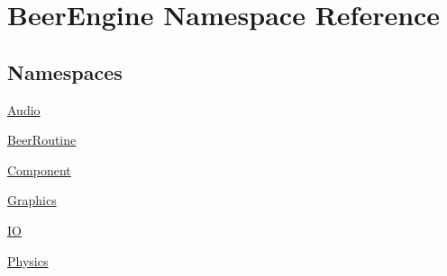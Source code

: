\hypertarget{namespace_beer_engine}{}\section{Beer\+Engine Namespace Reference}
\label{namespace_beer_engine}
\subsection*{Namespaces}
\begin{DoxyCompactItemize}
\item 
 \mbox{\hyperlink{namespace_beer_engine_1_1_audio}{Audio}}
\item 
 \mbox{\hyperlink{namespace_beer_engine_1_1_beer_routine}{Beer\+Routine}}
\item 
 \mbox{\hyperlink{namespace_beer_engine_1_1_component}{Component}}
\item 
 \mbox{\hyperlink{namespace_beer_engine_1_1_graphics}{Graphics}}
\item 
 \mbox{\hyperlink{namespace_beer_engine_1_1_i_o}{IO}}
\item 
 \mbox{\hyperlink{namespace_beer_engine_1_1_physics}{Physics}}
\end{DoxyCompactItemize}

